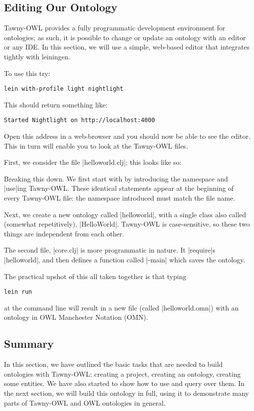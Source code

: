 \subsection{Editing Our Ontology}

Tawny-OWL provides a fully programmatic development environment for
ontologies; as such, it is possible to change or update an ontology
with an editor or any IDE. In this section, we will use a simple,
web-based editor that integrates tightly with leiningen.

To use this try:

\begin{verbatim}
lein with-profile light nightlight
\end{verbatim}

This should return something like:

\begin{verbatim}
Started Nightlight on http://localhost:4000
\end{verbatim}

Open this address in a web-browser and you should now be able to see
the editor. This in turn will enable you to look at the Tawny-OWL files.

First, we consider the file |helloworld.clj|; this looks like so:



Breaking this down. We first start with by introducing the namespace
and |use|ing Tawny-OWL. These identical statements appear at the
beginning of every Tawny-OWL file: the namespace introduced must match
the file name.

Next, we create a new ontology called |helloworld|, with a single
class also called (somewhat repetitively), |HelloWorld|. Tawny-OWL is
case-sensitive, so these two things are independent from each other.

The second file, |core.clj| is more programmatic in nature. It
|require|s |helloworld|, and then defines a function called |-main|
which saves the ontology.



The practical upshot of this all taken together is that typing

\begin{verbatim}
lein run
\end{verbatim}

at the command line will result in a new file (called
|helloworld.omn|) with an ontology in OWL Manchester Notation (OMN).

\subsection{Summary}

In this section, we have outlined the basic tasks that are needed to
build ontologies with Tawny-OWL: creating a project, creating an
ontology, creating some entities. We have also started to show how to
use and query over them. In the next section, we will build this
ontology in full, using it to demonstrate many parts of Tawny-OWL and
OWL ontologies in general.

